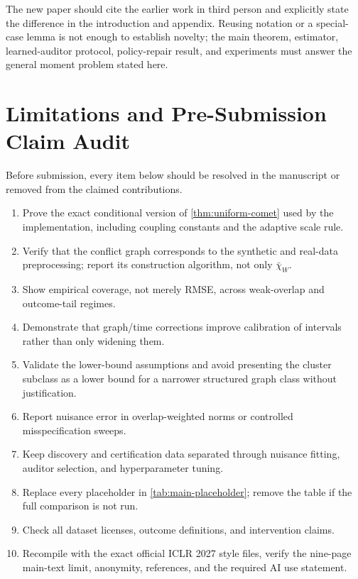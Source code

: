 The new paper should cite the earlier work in third person and explicitly state the difference in the introduction and appendix. Reusing notation or a special-case lemma is not enough to establish novelty; the main theorem, estimator, learned-auditor protocol, policy-repair result, and experiments must answer the general moment problem stated here.

\section{Limitations and Pre-Submission Claim Audit}
\label{app:limitations}

Before submission, every item below should be resolved in the manuscript or removed from the claimed contributions.
\begin{enumerate}[leftmargin=1.5em,itemsep=2pt]
    \item Prove the exact conditional version of \cref{thm:uniform-comet} used by the implementation, including coupling constants and the adaptive scale rule.
    \item Verify that the conflict graph corresponds to the synthetic and real-data preprocessing; report its construction algorithm, not only $\bar\chi_W$.
    \item Show empirical coverage, not merely RMSE, across weak-overlap and outcome-tail regimes.
    \item Demonstrate that graph/time corrections improve calibration of intervals rather than only widening them.
    \item Validate the lower-bound assumptions and avoid presenting the cluster subclass as a lower bound for a narrower structured graph class without justification.
    \item Report nuisance error in overlap-weighted norms or controlled misspecification sweeps.
    \item Keep discovery and certification data separated through nuisance fitting, auditor selection, and hyperparameter tuning.
    \item Replace every placeholder in \cref{tab:main-placeholder}; remove the table if the full comparison is not run.
    \item Check all dataset licenses, outcome definitions, and intervention claims.
    \item Recompile with the exact official ICLR 2027 style files, verify the nine-page main-text limit, anonymity, references, and the required AI use statement.
\end{enumerate}


